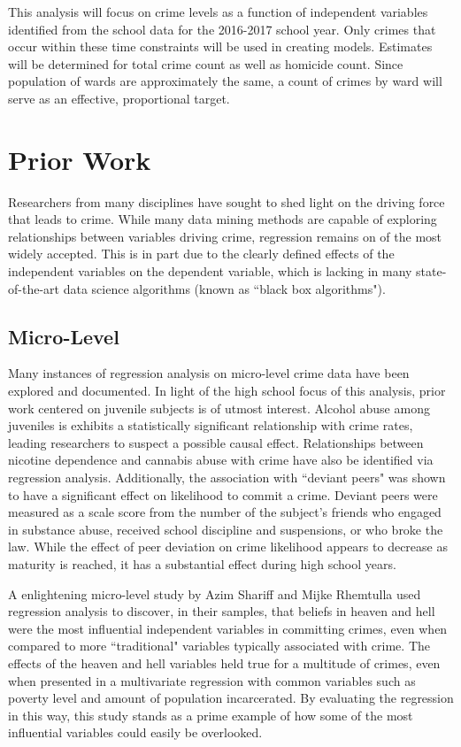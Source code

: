 \documentclass[12pt]{article}
\begin{document}
This analysis will focus on crime levels as a function of independent variables identified from the school data for the 2016-2017 school year.  Only crimes that occur within these time constraints will be used in creating models.  Estimates will be determined for total crime count as well as homicide count.  Since population of wards are approximately the same, a count of crimes by ward will serve as an effective, proportional target.

	\section{Prior Work}

Researchers from many disciplines have sought to shed light on the driving force that leads to crime.  While many data mining methods are capable of exploring relationships between variables driving crime, regression remains on of the most widely accepted.\cite{kaur}  This is in part due to the clearly defined effects of the independent variables on the dependent variable, which is lacking in many state-of-the-art data science algorithms (known as ``black box algorithms").

\subsection{Micro-Level}

Many instances of regression analysis on micro-level crime data have been explored and documented.  In light of the high school focus of this analysis, prior work centered on juvenile subjects is of utmost interest.  Alcohol abuse among juveniles is exhibits a statistically significant relationship with crime rates, leading researchers to suspect a possible causal effect.\cite{fergusson}  Relationships between nicotine dependence and cannabis abuse with crime have also be identified via regression analysis.\cite{ferg2}  Additionally, the association with ``deviant peers" was shown to have a significant effect on likelihood to commit a crime.  Deviant peers were measured as a scale score from the number of the subject's friends who engaged in substance abuse, received school discipline and suspensions, or who broke the law.  While the effect of peer deviation on crime likelihood appears to decrease as maturity is reached, it has a substantial effect during high school years.\cite{ferg2}

\par

A enlightening micro-level study by Azim Shariff and Mijke Rhemtulla used regression analysis to discover, in their samples, that beliefs in heaven and hell were the most influential independent variables in committing crimes, even when compared to more ``traditional" variables typically associated with crime.\cite{shariff}  The effects of the heaven and hell variables held true for a multitude of crimes, even when presented in a multivariate regression with common variables such as poverty level and amount of population incarcerated.  By evaluating the regression in this way, this study stands as a prime example of how some of the most influential variables could easily be overlooked.
\end{document}

